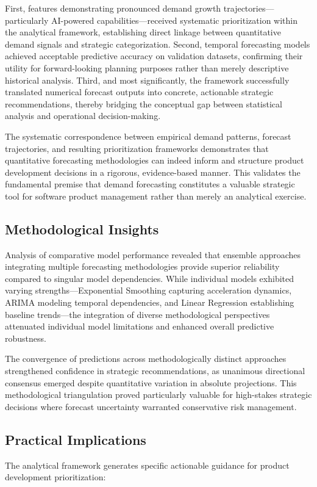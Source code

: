 First, features demonstrating pronounced demand growth trajectories—particularly AI-powered capabilities—received systematic prioritization within the analytical framework, establishing direct linkage between quantitative demand signals and strategic categorization. Second, temporal forecasting models achieved acceptable predictive accuracy on validation datasets, confirming their utility for forward-looking planning purposes rather than merely descriptive historical analysis. Third, and most significantly, the framework successfully translated numerical forecast outputs into concrete, actionable strategic recommendations, thereby bridging the conceptual gap between statistical analysis and operational decision-making.

The systematic correspondence between empirical demand patterns, forecast trajectories, and resulting prioritization frameworks demonstrates that quantitative forecasting methodologies can indeed inform and structure product development decisions in a rigorous, evidence-based manner. This validates the fundamental premise that demand forecasting constitutes a valuable strategic tool for software product management rather than merely an analytical exercise.

\subsection{Methodological Insights}
Analysis of comparative model performance revealed that ensemble approaches integrating multiple forecasting methodologies provide superior reliability compared to singular model dependencies. While individual models exhibited varying strengths—Exponential Smoothing capturing acceleration dynamics, ARIMA modeling temporal dependencies, and Linear Regression establishing baseline trends—the integration of diverse methodological perspectives attenuated individual model limitations and enhanced overall predictive robustness.

The convergence of predictions across methodologically distinct approaches strengthened confidence in strategic recommendations, as unanimous directional consensus emerged despite quantitative variation in absolute projections. This methodological triangulation proved particularly valuable for high-stakes strategic decisions where forecast uncertainty warranted conservative risk management.

\subsection{Practical Implications}
The analytical framework generates specific actionable guidance for product development prioritization:

